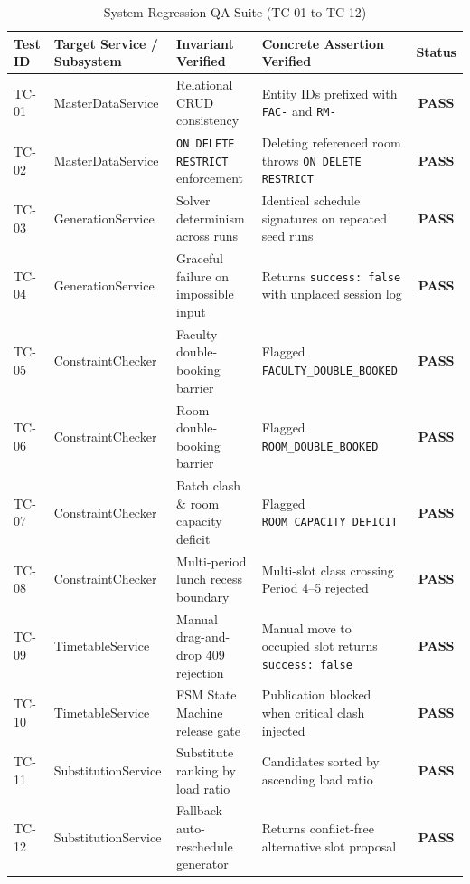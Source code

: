 \documentclass[11pt,a4paper]{article}
\begin{document}
\begin{table}[H]
\centering
\scriptsize
\begin{tabular}{@{}lp{3.5cm}p{4.2cm}p{4.0cm}c@{}}
\toprule
\textbf{Test ID} & \textbf{Target Service / Subsystem} & \textbf{Invariant Verified} & \textbf{Concrete Assertion Verified} & \textbf{Status} \\ \midrule
TC-01 & MasterDataService & Relational CRUD consistency & Entity IDs prefixed with \texttt{FAC-} and \texttt{RM-} & \textbf{PASS} \\
TC-02 & MasterDataService & \texttt{ON DELETE RESTRICT} enforcement & Deleting referenced room throws \texttt{ON DELETE RESTRICT} & \textbf{PASS} \\
TC-03 & GenerationService & Solver determinism across runs & Identical schedule signatures on repeated seed runs & \textbf{PASS} \\
TC-04 & GenerationService & Graceful failure on impossible input & Returns \texttt{success: false} with unplaced session log & \textbf{PASS} \\
TC-05 & ConstraintChecker & Faculty double-booking barrier & Flagged \texttt{FACULTY\_DOUBLE\_BOOKED} & \textbf{PASS} \\
TC-06 & ConstraintChecker & Room double-booking barrier & Flagged \texttt{ROOM\_DOUBLE\_BOOKED} & \textbf{PASS} \\
TC-07 & ConstraintChecker & Batch clash \& room capacity deficit & Flagged \texttt{ROOM\_CAPACITY\_DEFICIT} & \textbf{PASS} \\
TC-08 & ConstraintChecker & Multi-period lunch recess boundary & Multi-slot class crossing Period 4--5 rejected & \textbf{PASS} \\
TC-09 & TimetableService & Manual drag-and-drop 409 rejection & Manual move to occupied slot returns \texttt{success: false} & \textbf{PASS} \\
TC-10 & TimetableService & FSM State Machine release gate & Publication blocked when critical clash injected & \textbf{PASS} \\
TC-11 & SubstitutionService & Substitute ranking by load ratio & Candidates sorted by ascending load ratio & \textbf{PASS} \\
TC-12 & SubstitutionService & Fallback auto-reschedule generator & Returns conflict-free alternative slot proposal & \textbf{PASS} \\ \bottomrule
\end{tabular}
\caption{System Regression QA Suite (TC-01 to TC-12)}
\end{table}
\end{document}
